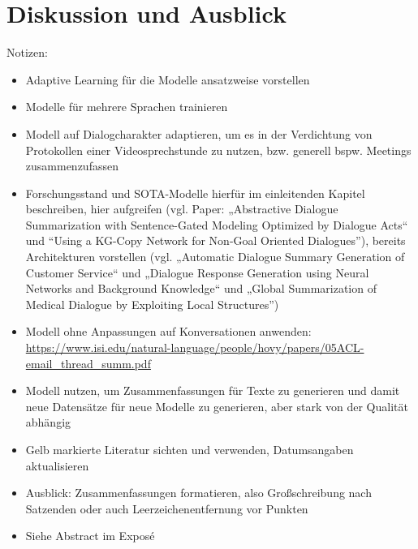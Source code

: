 \chapter{Diskussion und Ausblick}
\thispagestyle{fancy}
\label{chap:Diskussion und Ausblick}

Notizen:
\begin{itemize}
	\item Adaptive Learning für die Modelle ansatzweise vorstellen
	\item Modelle für mehrere Sprachen trainieren
	\item Modell auf Dialogcharakter adaptieren, um es in der Verdichtung von Protokollen einer Videosprechstunde zu nutzen, bzw. generell bspw. Meetings zusammenzufassen
	\item Forschungsstand und SOTA-Modelle hierfür im einleitenden Kapitel beschreiben, hier aufgreifen (vgl. Paper: „Abstractive Dialogue Summarization with Sentence-Gated Modeling Optimized by Dialogue Acts“ und “Using a KG-Copy Network for Non-Goal Oriented Dialogues”), bereits Architekturen vorstellen (vgl. „Automatic Dialogue Summary Generation of Customer Service“ und „Dialogue Response Generation using Neural Networks and Background Knowledge“ und „Global Summarization of Medical Dialogue by Exploiting Local Structures”)
	\item Modell ohne Anpassungen auf Konversationen anwenden: \url{https://www.isi.edu/natural-language/people/hovy/papers/05ACL-email_thread_summ.pdf}
	\item Modell nutzen, um Zusammenfassungen für Texte zu generieren und damit neue Datensätze für neue Modelle zu generieren, aber stark von der Qualität abhängig
	\item Gelb markierte Literatur sichten und verwenden, Datumsangaben aktualisieren
	\item Ausblick: Zusammenfassungen formatieren, also Großschreibung nach Satzenden oder auch Leerzeichenentfernung vor Punkten
	\item Siehe Abstract im Exposé
\end{itemize}
